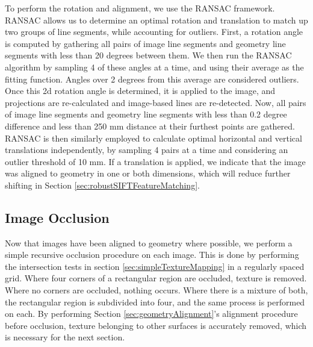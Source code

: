 \documentclass[]{spie}  %
\begin{document}
To perform the rotation and alignment, we use the RANSAC
\cite{fischler1981random} framework. RANSAC allows us to determine an
optimal rotation and translation to match up two groups of line
segments, while accounting for outliers. First, a rotation angle is
computed by gathering all pairs of image line segments and geometry
line segments with less than 20 degrees between them. We then run the
RANSAC algorithm by sampling 4 of these angles at a time, and using
their average as the fitting function. Angles over 2 degrees from this
average are considered outliers. Once this 2d rotation angle is
determined, it is applied to the image, and projections are
re-calculated and image-based lines are re-detected. Now, all pairs of
image line segments and geometry line segments with less than 0.2
degree difference and less than 250 mm distance at their furthest
points are gathered. RANSAC is then similarly employed to calculate
optimal horizontal and vertical translations independently, by
sampling 4 pairs at a time and considering an outlier threshold of 10
mm. If a translation is applied, we indicate that the image was
aligned to geometry in one or both dimensions, which will reduce
further shifting in Section \ref{sec:robustSIFTFeatureMatching}.

\subsection{Image Occlusion}
\label{sec:imageOcclusion}
Now that images have been aligned to geometry where possible, we
perform a simple recursive occlusion procedure on each image. This is
done by performing the intersection tests in section
\ref{sec:simpleTextureMapping} in a regularly spaced grid. Where four
corners of a rectangular region are occluded, texture is
removed. Where no corners are occluded, nothing occurs. Where there is
a mixture of both, the rectangular region is subdivided into four, and
the same process is performed on each. By performing Section
\ref{sec:geometryAlignment}'s alignment procedure before occlusion,
texture belonging to other surfaces is accurately removed, which is
necessary for the next section.
\end{document}
